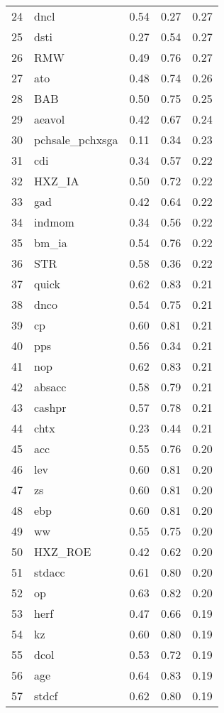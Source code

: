 \documentclass[12pt]{article}
\begin{document}
\begin{footnotesize}
\begin{longtable}{rl|c|c|c}
  24 & dncl & 0.54 & 0.27 & 0.27 \\ 
  25 & dsti & 0.27 & 0.54 & 0.27 \\ 
  26 & RMW & 0.49 & 0.76 & 0.27 \\ 
  27 & ato & 0.48 & 0.74 & 0.26 \\ 
  28 & BAB & 0.50 & 0.75 & 0.25 \\ 
  29 & aeavol & 0.42 & 0.67 & 0.24 \\ 
  30 & pchsale\_pchxsga & 0.11 & 0.34 & 0.23 \\ 
  31 & cdi & 0.34 & 0.57 & 0.22 \\ 
  32 & HXZ\_IA & 0.50 & 0.72 & 0.22 \\ 
  33 & gad & 0.42 & 0.64 & 0.22 \\ 
  34 & indmom & 0.34 & 0.56 & 0.22 \\ 
  35 & bm\_ia & 0.54 & 0.76 & 0.22 \\ 
  36 & STR & 0.58 & 0.36 & 0.22 \\ 
  37 & quick & 0.62 & 0.83 & 0.21 \\ 
  38 & dnco & 0.54 & 0.75 & 0.21 \\ 
  39 & cp & 0.60 & 0.81 & 0.21 \\ 
  40 & pps & 0.56 & 0.34 & 0.21 \\ 
  41 & nop & 0.62 & 0.83 & 0.21 \\ 
  42 & absacc & 0.58 & 0.79 & 0.21 \\ 
  43 & cashpr & 0.57 & 0.78 & 0.21 \\ 
  44 & chtx & 0.23 & 0.44 & 0.21 \\ 
  45 & acc & 0.55 & 0.76 & 0.20 \\ 
  46 & lev & 0.60 & 0.81 & 0.20 \\ 
  47 & zs & 0.60 & 0.81 & 0.20 \\ 
  48 & ebp & 0.60 & 0.81 & 0.20 \\ 
  49 & ww & 0.55 & 0.75 & 0.20 \\ 
  50 & HXZ\_ROE & 0.42 & 0.62 & 0.20 \\ 
  51 & stdacc & 0.61 & 0.80 & 0.20 \\ 
  52 & op & 0.63 & 0.82 & 0.20 \\ 
  53 & herf & 0.47 & 0.66 & 0.19 \\ 
  54 & kz & 0.60 & 0.80 & 0.19 \\ 
  55 & dcol & 0.53 & 0.72 & 0.19 \\ 
  56 & age & 0.64 & 0.83 & 0.19 \\ 
  57 & stdcf & 0.62 & 0.80 & 0.19 \\ 

\end{longtable}
\end{footnotesize}
\end{document}
